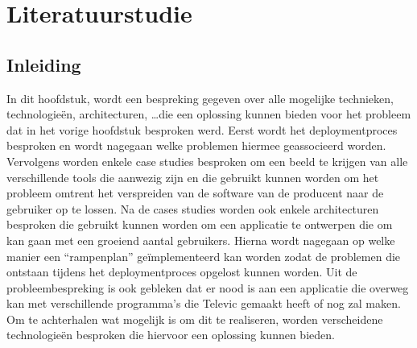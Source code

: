 \chapter{Literatuurstudie}
\section{Inleiding}
In dit hoofdstuk, wordt een bespreking gegeven over alle mogelijke technieken, technologieën, architecturen, \ldots die een oplossing kunnen bieden voor het probleem dat in het vorige hoofdstuk besproken werd.
Eerst wordt het deploymentproces besproken en wordt nagegaan welke problemen hiermee geassocieerd worden.
Vervolgens worden enkele case studies besproken om een beeld te krijgen van alle verschillende tools die aanwezig zijn en die gebruikt kunnen worden om het probleem omtrent het verspreiden van de software van de producent naar de gebruiker op te lossen.
Na de cases studies worden ook enkele architecturen besproken die gebruikt kunnen worden om een applicatie te ontwerpen die om kan gaan met een groeiend aantal gebruikers.
Hierna wordt nagegaan op welke manier een ``rampenplan'' geïmplementeerd kan worden zodat de problemen die ontstaan tijdens het deploymentproces opgelost kunnen worden.
Uit de probleembespreking is ook gebleken dat er nood is aan een applicatie die overweg kan met verschillende programma's die Televic gemaakt heeft of nog zal maken.
Om te achterhalen wat mogelijk is om dit te realiseren, worden verscheidene technologieën besproken die hiervoor een oplossing kunnen bieden.

